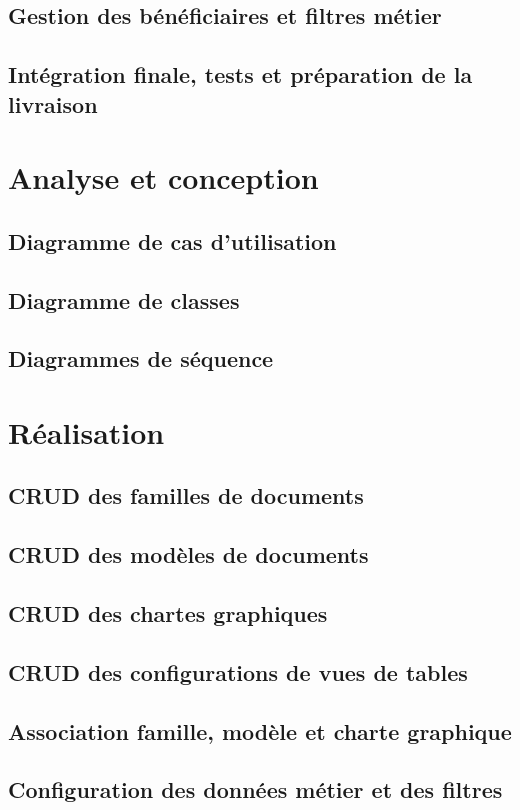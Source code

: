 \documentclass[12pt,a4paper]{report}
\begin{document}
\subsection{Gestion des bénéficiaires et filtres métier}
\subsection{Intégration finale, tests et préparation de la livraison}
\section{Analyse et conception}
\subsection{Diagramme de cas d'utilisation}
\subsection{Diagramme de classes}
\subsection{Diagrammes de séquence}
\section{Réalisation}
\subsection{CRUD des familles de documents}
\subsection{CRUD des modèles de documents}
\subsection{CRUD des chartes graphiques}
\subsection{CRUD des configurations de vues de tables}
\subsection{Association famille, modèle et charte graphique}
\subsection{Configuration des données métier et des filtres}
\end{document}
